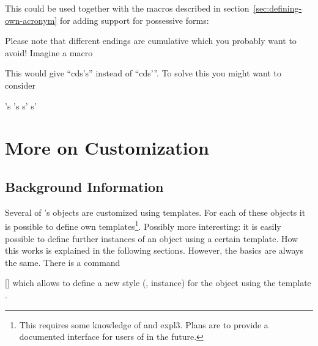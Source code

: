 \documentclass{acro-manual}
\begin{document}
This could be used together with the macros described in
section~\vref{sec:defining-own-acronym} for adding support for possessive
forms:

Please note that different endings are cumulative which you probably want to
avoid! Imagine a macro
This would give \enquote{\ac{cd}s's} instead of \enquote{\ac{cd}s'}.  To solve
this you might want to consider
\begin{sourcecode}
     {'s} {'s}
       {s'} {s'}
\end{sourcecode}

\section{More on Customization}\label{sec:more-custom}
\subsection{Background Information}
Several of \acro's objects are customized using templates.  For each of these
objects it is possible to define own templates\footnote{This requires some
knowledge of  and expl3.  Plans are to provide a documented
interface for users of \acro{} in the future.}.  Possibly more interesting: it
is easily possible to define further instances of an object using a certain
template.  How this works is explained in the following sections. However, the
basics are always the same.  There is a command
\begin{commands}
  []
    which allows to define a new style (\ie, instance) for the object
     using the template .
\end{commands}
\end{document}
